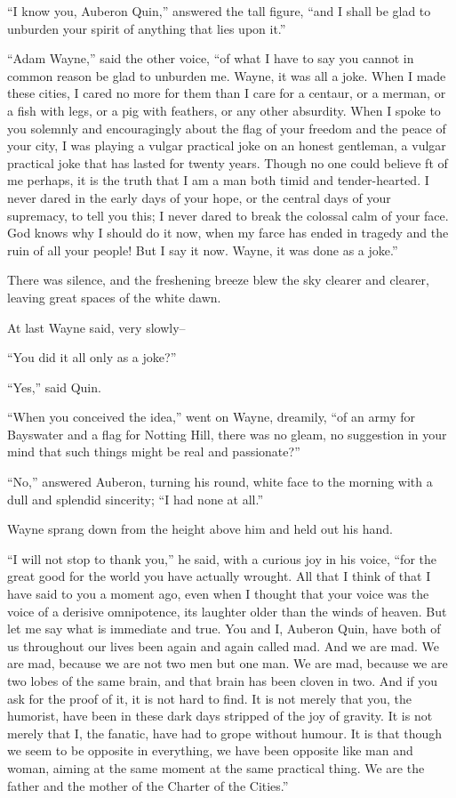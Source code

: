 \documentclass{book}
\begin{document}
“I know you, Auberon Quin,” answered the tall figure, “and I shall be glad to unburden your spirit of anything that lies upon it.”

“Adam Wayne,” said the other voice, “of what I have to say you cannot in common reason be glad to unburden me. Wayne, it was all a joke. When I made these cities, I cared no more for them than I care for a centaur, or a merman, or a fish with legs, or a pig with feathers, or any other absurdity. When I spoke to you solemnly and encouragingly about the flag of your freedom and the peace of your city, I was playing a vulgar practical joke on an honest gentleman, a vulgar practical joke that has lasted for twenty years. Though no one could believe ft of me perhaps, it is the truth that I am a man both timid and tender-hearted. I never dared in the early days of your hope, or the central days of your supremacy, to tell you this; I never dared to break the colossal calm of your face. God knows why I should do it now, when my farce has ended in tragedy and the ruin of all your people! But I say it now. Wayne, it was done as a joke.”

There was silence, and the freshening breeze blew the sky clearer and clearer, leaving great spaces of the white dawn.

At last Wayne said, very slowly–

“You did it all only as a joke?”

“Yes,” said Quin.

“When you conceived the idea,” went on Wayne, dreamily, “of an army for Bayswater and a flag for Notting Hill, there was no gleam, no suggestion in your mind that such things might be real and passionate?”

“No,” answered Auberon, turning his round, white face to the morning with a dull and splendid sincerity; “I had none at all.”

Wayne sprang down from the height above him and held out his hand.

“I will not stop to thank you,” he said, with a curious joy in his voice, “for the great good for the world you have actually wrought. All that I think of that I have said to you a moment ago, even when I thought that your voice was the voice of a derisive omnipotence, its laughter older than the winds of heaven. But let me say what is immediate and true. You and I, Auberon Quin, have both of us throughout our lives been again and again called mad. And we are mad. We are mad, because we are not two men but one man. We are mad, because we are two lobes of the same brain, and that brain has been cloven in two. And if you ask for the proof of it, it is not hard to find. It is not merely that you, the humorist, have been in these dark days stripped of the joy of gravity. It is not merely that I, the fanatic, have had to grope without humour. It is that though we seem to be opposite in everything, we have been opposite like man and woman, aiming at the same moment at the same practical thing. We are the father and the mother of the Charter of the Cities.”
\end{document}
